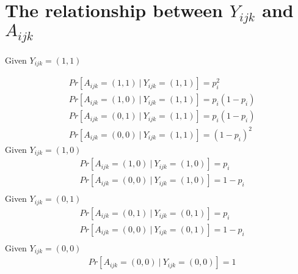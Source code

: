 \documentclass{article}
\numberwithin{equation}{section}
\newtheorem{sampling strategy}{Sampling Strategy}
\begin{document}
\printAffiliationsAndNotice{}  %


\section{The relationship between $Y_{ijk}$ and $A_{ijk}$}

Given $Y_{ijk} = (1,1)$

\begin{equation}
\begin{aligned}
    & Pr[A_{ijk} = (1,1) ~|~ Y_{ijk} = (1,1)] = p_i^2 \\ 
    & Pr[A_{ijk} = (1,0) ~|~ Y_{ijk} = (1,1)] = p_i(1-p_i) \\
    & Pr[A_{ijk} = (0,1) ~|~ Y_{ijk} = (1,1)] = p_i(1-p_i) \\
    & Pr[A_{ijk} = (0,0) ~|~ Y_{ijk} = (1,1)] = (1-p_i)^2 \nonumber
\end{aligned}
\end{equation}
Given $Y_{ijk} = (1,0)$
\begin{equation}
\begin{aligned}
    & Pr[A_{ijk} = (1,0) ~|~ Y_{ijk} = (1,0)] = p_i \\ 
    & Pr[A_{ijk} = (0,0) ~|~ Y_{ijk} = (1,0)] = 1-p_i \\
 \nonumber
\end{aligned}
\end{equation}
Given $Y_{ijk} = (0,1)$
\begin{equation}
\begin{aligned}
    & Pr[A_{ijk} = (0,1) ~|~ Y_{ijk} = (0,1)] = p_i \\ 
    & Pr[A_{ijk} = (0,0) ~|~ Y_{ijk} = (0,1)] = 1-p_i \\
 \nonumber
\end{aligned}
\end{equation}
Given $Y_{ijk} = (0,0)$
\begin{equation}
\begin{aligned}
    & Pr[A_{ijk} = (0,0) ~|~ Y_{ijk} = (0,0)] = 1 \\ 
 \nonumber
\end{aligned}
\end{equation}

\end{document}
